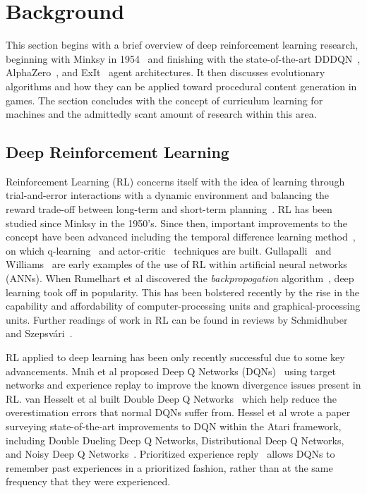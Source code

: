 \documentclass[letterpaper]{article} %
\begin{document}
\section{Background}\label{sec:background}
This section begins with a brief overview of deep reinforcement learning research, beginning with Minksy in 1954~\cite{minsky1954theory} and finishing with the state-of-the-art DDDQN~\cite{wang2016dueling}, AlphaZero~\cite{silver2017mastering,silver2017masteringchess}, and ExIt~\cite{anthony2017thinking} agent architectures. It then discusses evolutionary algorithms and how they can be applied toward procedural content generation in games. The section concludes with the concept of curriculum learning for machines and the admittedly scant amount of research within this area.

\subsection{Deep Reinforcement Learning}
Reinforcement Learning (RL) concerns itself with the idea of learning through trial-and-error interactions with a dynamic environment and balancing the reward trade-off between long-term and short-term planning~\cite{sutton1998introduction}.
RL has been studied since Minksy \cite{minsky1954theory} in the 1950's.
Since then, important improvements to the concept have been advanced including the temporal difference learning method~\cite{sutton1984temporal,sutton1988learning}, on which q-learning~\cite{watkins1992q} and actor-critic~\cite{barto1983neuronlike} techniques are built.
Gullapalli~\cite{gullapalli1990stochastic} and Williams~\cite{williams1992simple} are early examples of the use of RL within artificial neural networks (ANNs).
When Rumelhart et al discovered the \emph{backpropogation}
algorithm~\cite{rumelhart1986learning}, deep learning took off in popularity. This has been bolstered recently by the rise in the capability and affordability of computer-processing units and graphical-processing units.
Further readings of work in RL can be found in reviews by Schmidhuber~\cite{schmidhuber2015deep} and Szepsv\'ari~\cite{szepesvari2010algorithms}.

RL applied to deep learning has been only recently successful due to some key advancements.
Mnih et al proposed Deep Q Networks (DQNs)~\cite{mnih2015human} using target networks and experience replay to improve the known divergence issues present in RL.
van Hesselt et al built Double Deep Q Networks~\cite{van2016deep} which help reduce the overestimation errors that normal DQNs suffer from. Hessel et al wrote a paper surveying state-of-the-art improvements to DQN within the Atari framework, including Double Dueling Deep Q Networks, Distributional Deep Q Networks, and Noisy Deep Q Networks~\cite{hessel2017rainbow}.
Prioritized experience reply~\cite{schaul2015prioritized} allows DQNs to remember past experiences in a prioritized fashion, rather than at the same frequency that they were experienced.
\end{document}
